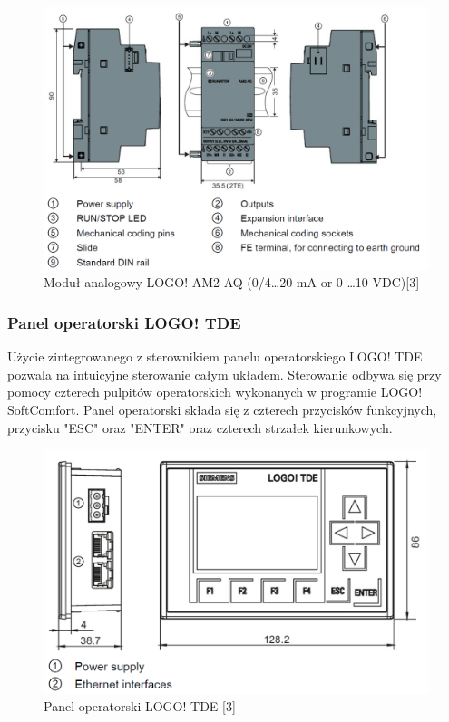 \documentclass[oneside]{mgr}
\begin{document}
\begin{figure}[h!]
    \centering
    \includegraphics[width=\textwidth]{Modul_analogowy.PNG}
    \caption{Moduł analogowy LOGO! AM2 AQ (0/4\dots20 mA or 0 \dots 10 VDC)[3]}
\end{figure}

\subsubsection{Panel operatorski LOGO! TDE}

Użycie zintegrowanego z sterownikiem panelu operatorskiego LOGO! TDE pozwala na intuicyjne sterowanie całym układem. Sterowanie odbywa się przy pomocy czterech pulpitów operatorskich wykonanych w programie LOGO! SoftComfort. Panel operatorski składa się z czterech przycisków funkcyjnych, przycisku "ESC" oraz "ENTER" oraz czterech strzałek kierunkowych.

\begin{figure}[h!]
    \centering
    \includegraphics[width=\textwidth]{HMI.PNG}
    \caption{Panel operatorski LOGO! TDE [3]}
\end{figure}
\end{document}
